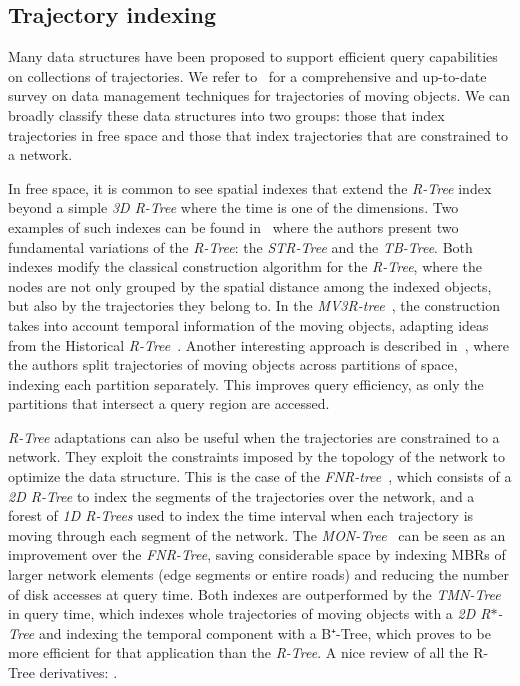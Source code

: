 \documentclass[runningheads]{llncs}
\begin{document}
\subsection{Trajectory indexing}
Many data structures have been proposed to support efficient 
query capabilities on collections of
trajectories. We refer to~\cite[Chapter 4]{DBLP:books/sp/PelekisT14} for a comprehensive and
up-to-date survey on data management techniques for trajectories of moving objects. We can broadly
classify these data structures into two groups: those that index trajectories in free space and
those that index trajectories that are constrained to a network.

In free space, it is common to see spatial indexes that extend the {\em R-Tree} %
index~\cite{DBLP:conf/sigmod/Guttman84} beyond a simple {\em 3D R-Tree} where the time is one of the dimensions.
Two examples of such indexes can be found in~\cite{DBLP:conf/vldb/PfoserJT00}
where the authors present two fundamental variations of the {\em R-Tree}: the {\em STR-Tree} and the {\em TB-Tree}.
Both indexes modify the classical construction algorithm for the {\em R-Tree},
where the nodes are not only grouped by the spatial distance among the indexed objects,
but also by the trajectories they belong to. In the {\em MV3R-tree}~\cite{DBLP:conf/vldb/PapadiasT01},
the construction takes into account temporal information of the moving objects,
adapting ideas from the Historical {\em R-Tree}~\cite{nascimento1998towards}. Another
interesting approach is described in~\cite{chakka2003indexing}, where the authors
split trajectories of moving objects across partitions of space, indexing each partition
separately. This improves query efficiency, as only the partitions that intersect
a query region are accessed.

{\em R-Tree} adaptations can also be useful when the trajectories are constrained to a network.
They exploit the constraints imposed by the topology of the network to optimize the data structure.
This is the case of the {\em FNR-tree}~\cite{DBLP:conf/ssd/Frentzos03}, which consists of a 
{\em 2D R-Tree} to index the %
segments of the trajectories over the network,
and a forest of {\em 1D R-Trees} used to index the time interval when each trajectory is moving through
each segment of the network.
The {\em MON-Tree}~\cite{DBLP:journals/geoinformatica/AlmeidaG05} can be seen as an
improvement over the {\em FNR-Tree}, saving considerable space by indexing MBRs of larger
network elements (edge segments or entire roads) and reducing the number of disk accesses at query time.
Both indexes are outperformed by the {\em TMN-Tree}~\cite{chang2010tmn} in query time,
which indexes whole trajectories of moving objects with a {\em 2D R$*$-Tree} and
indexing the temporal component with a B$⁺$-Tree, which proves to be more efficient for
that application than the {\em R-Tree}.
A nice review of all the R-Tree derivatives: \cite{john2017performance}.
\end{document}
